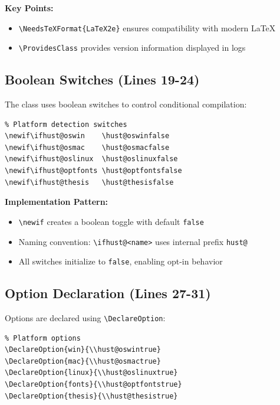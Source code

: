 \documentclass[linux]{hustreport}
\begin{document}
\textbf{Key Points:}
\begin{itemize}
    \item \verb|\NeedsTeXFormat{LaTeX2e}| ensures compatibility with modern \LaTeX{}
    \item \verb|\ProvidesClass| provides version information displayed in logs
\end{itemize}

\subsection{Boolean Switches (Lines 19-24)}

The class uses boolean switches to control conditional compilation:

\begin{verbatim}
% Platform detection switches
\newif\ifhust@oswin    \hust@oswinfalse
\newif\ifhust@osmac    \hust@osmacfalse
\newif\ifhust@oslinux  \hust@oslinuxfalse
\newif\ifhust@optfonts \hust@optfontsfalse
\newif\ifhust@thesis   \hust@thesisfalse
\end{verbatim}

\textbf{Implementation Pattern:}
\begin{itemize}
    \item \verb|\newif| creates a boolean toggle with default \texttt{false}
    \item Naming convention: \verb|\ifhust@<name>| uses internal prefix \verb|hust@|
    \item All switches initialize to \texttt{false}, enabling opt-in behavior
\end{itemize}

\subsection{Option Declaration (Lines 27-31)}

Options are declared using \verb|\DeclareOption|:

\begin{verbatim}
% Platform options
\DeclareOption{win}{\\hust@oswintrue}
\DeclareOption{mac}{\\hust@osmactrue}
\DeclareOption{linux}{\\hust@oslinuxtrue}
\DeclareOption{fonts}{\\hust@optfontstrue}
\DeclareOption{thesis}{\\hust@thesistrue}
\end{verbatim}
\end{document}
